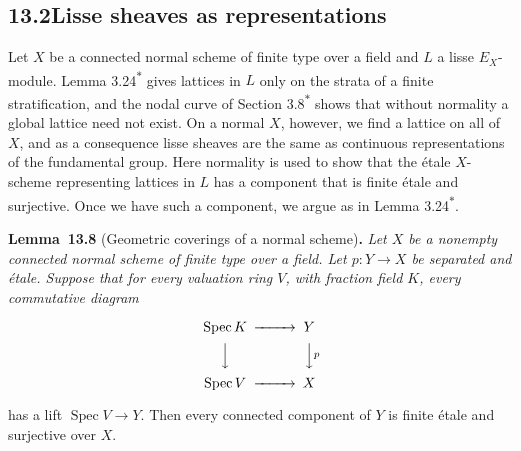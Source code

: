 \documentclass[11pt]{article}
\newenvironment{bpstatement}[2]{\par\addvspace{0.6\baselineskip}\noindent\textbf{#1}#2\textbf{.}\enspace\ignorespaces}
  {\par\addvspace{0.4\baselineskip}}
\newenvironment{bpstatementit}[2]{\begin{bpstatement}{#1}{#2}\itshape\ignorespaces}{\end{bpstatement}}
\newcommand{\bpout}[1]{#1\textsuperscript{\hyperlink{bp-outside}{\ensuremath{\ast}}}}
\begin{document}
\subsection*{\texorpdfstring{13.2\quad Lisse sheaves as representations}{13.2 Lisse sheaves as representations}}
\label{bp24}%
\label{bp25}%
Let \(X\) be a connected normal scheme of finite type over a field and \(L\) a lisse \(E_X\)-module. Lemma \bpout{3.24} gives lattices in \(L\) only on the strata of a finite stratification, and the nodal curve of Section \bpout{3.8} shows that without normality a global lattice need not exist. On a normal \(X\), however, we find a lattice on all of \(X\), and as a consequence lisse sheaves are the same as continuous representations of the fundamental group. Here normality is used to show that the étale \(X\)-scheme representing lattices in \(L\) has a component that is finite étale and surjective. Once we have such a component, we argue as in Lemma \bpout{3.24}.

\label{bp26}%
\begin{bpstatementit}{Lemma~13.8}{ (Geometric coverings of a normal scheme)}
Let \(X\) be a nonempty connected normal scheme of finite type over a field. Let \(p:Y\to X\) be separated and étale. Suppose that for every valuation ring \(V\), with fraction field \(K\), every commutative diagram

\[
\begin{CD}
\operatorname{Spec}K @>>> Y\\
@VVV @VVpV\\
\operatorname{Spec}V @>>> X
\end{CD}
\]

has a lift \(\operatorname{Spec}V\to Y\). Then every connected component of \(Y\) is finite étale and surjective over \(X\).
\end{bpstatementit}
\end{document}
